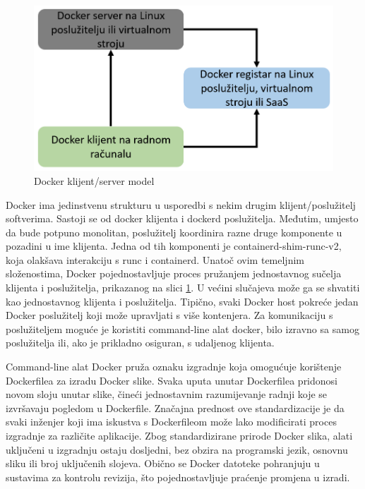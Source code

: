 \documentclass[a4paper,12pt,oneside]{article}
\begin{document}
\begin{figure}[ht!] %
	\centering %
	\includegraphics[scale=0.5]{./Slike/docker klijent-server model.png} %
	\caption{Docker klijent/server model \cite{kane2023docker} \label{f:docker klijent/server model}} %
\end{figure}

Docker ima jedinstvenu strukturu u usporedbi s nekim drugim klijent/poslužitelj softverima. Sastoji se od docker klijenta i dockerd poslužitelja. Međutim, umjesto da bude potpuno monolitan, poslužitelj koordinira razne druge komponente u pozadini u ime klijenta. Jedna od tih komponenti je containerd-shim-runc-v2, koja olakšava interakciju s runc i containerd. Unatoč ovim temeljnim složenostima, Docker pojednostavljuje proces pružanjem jednostavnog sučelja klijenta i poslužitelja, prikazanog na slici \ref{f:docker klijent/server model}. U većini slučajeva može ga se shvatiti kao jednostavnog klijenta i poslužitelja. Tipično, svaki Docker host pokreće jedan Docker poslužitelj koji može upravljati s više kontenjera. Za komunikaciju s poslužiteljem moguće je koristiti command-line alat docker, bilo izravno sa samog poslužitelja ili, ako je prikladno osiguran, s udaljenog klijenta.

Command-line alat Docker pruža oznaku izgradnje koja omogućuje korištenje Dockerfilea za izradu Docker slike. Svaka uputa unutar Dockerfilea pridonosi novom sloju unutar slike, čineći jednostavnim razumijevanje radnji koje se izvršavaju pogledom u Dockerfile. Značajna prednost ove standardizacije je da svaki inženjer koji ima iskustva s Dockerfileom može lako modificirati proces izgradnje za različite aplikacije. Zbog standardizirane prirode Docker slika, alati uključeni u izgradnju ostaju dosljedni, bez obzira na programski jezik, osnovnu sliku ili broj uključenih slojeva. Obično se Docker datoteke pohranjuju u sustavima za kontrolu revizija, što pojednostavljuje praćenje promjena u izradi.
\end{document}
